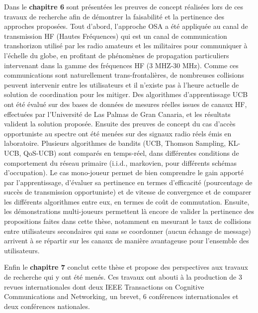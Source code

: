 Dans le \textbf{chapitre 6} sont présentées les preuves de concept réalisées lors de ces travaux de recherche afin de démontrer la faisabilité et la pertinence des approches proposées. Tout d’abord, l’approche OSA a été appliquée au canal de transmission HF (Hautes Fréquences) qui est un canal de communication transhorizon utilisé par les radio amateurs et les militaires pour communiquer à l’échelle du globe, en profitant de phénomènes de propagation particuliers intervenant dans la gamme des fréquences HF (3 MHZ-30 MHz). Comme ces communications sont naturellement trans-frontalières, de nombreuses collisions peuvent intervenir entre les utilisateurs et il n’existe pas à l’heure actuelle de solution de coordination pour les mitiger. Des algorithmes d’apprentissage UCB ont été évalué sur des bases de données de mesures réelles issues de canaux HF, effectuées par l’Université de Las Palmas de Gran Canaria, et les résultats valident la solution proposée. Ensuite des preuves de concept du cas d’accès opportuniste au spectre ont été menées sur des signaux radio réels émis en laboratoire. Plusieurs algorithmes de bandits (UCB, Thomson Sampling, KL-UCB, QoS-UCB) sont comparés en temps-réel, dans différentes conditions de comportement du réseau primaire (i.i.d., markovien, pour différents schémas d’occupation). Le cas mono-joueur permet de bien comprendre le gain apporté par l’apprentissage, d’évaluer sa pertinence en termes d’efficacité (pourcentage de succès de transmission opportuniste) et de vitesse de convergence et de comparer les différents algorithmes entre eux, en termes de coût de commutation. Ensuite, les démonstrations multi-joueurs permettent là encore de valider la pertinence des propositions faites dans cette thèse, notamment en mesurant le taux de collisions entre utilisateurs secondaires qui sans se coordonner (aucun échange de message) arrivent à se répartir sur les canaux de manière avantageuse pour l’ensemble des utilisateurs.

Enfin le \textbf{chapitre 7} conclut cette thèse et propose des perspectives aux travaux de recherche qui y ont été menés. Ces travaux ont abouti à la production de 3 revues internationales dont deux IEEE Transactions on Cognitive Communications and Networking, un brevet, 6 conférences internationales et deux conférences nationales. 

